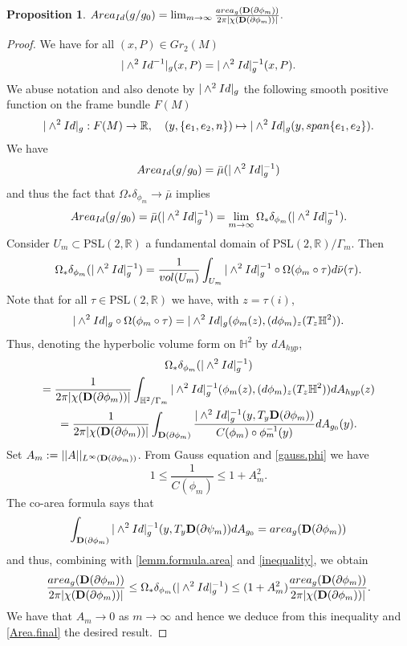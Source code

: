 \documentclass[11pt]{amsart}
\def\R{\mathbb R}
\def\H{\mathbb H}
\newtheorem{prop}[thm]{Proposition}
\theoremstyle{remark}
\theoremstyle{definition}
\begin{document}
{{	
	\begin{prop}\label{compute}   
		$ {\rm Area}_{\rm Id}(g/g_0)=\lim_{m\to\infty}\frac{{\rm area}_g({\bf D}(\partial\phi_m))}{2\pi|\chi({\bf D}(\partial\phi_m))|}.$
	\end{prop}
	\begin{proof}
		We have for all $(x,P)\in Gr_2(M)$
		$$|\wedge^2{\rm Id}^{-1}|_g(x,P)=|\wedge^2{\rm Id}|^{-1}_g(x,P).$$
		We abuse notation and also denote by $|\wedge^2{\rm Id}|_g$ the following smooth positive function on the frame bundle $F(M)$ 
		$$|\wedge^2{\rm Id}|_g: F(M)\rightarrow \R, \quad (y,\{e_1,e_2,n\})\mapsto|\wedge^2{\rm Id}|_g(y,{\rm span}\{e_1,e_2\}).$$
		We have
		$${\rm Area}_{\rm Id}(g/g_0) ={\bar\mu}(|\wedge^2{\rm Id}|^{-1}_g)$$
		and thus the fact that $\Omega_*\delta_{\phi_m}\to {\bar\mu}$ implies
		\begin{equation}\label{Area.final}
			{\rm Area}_{\rm Id}(g/g_0) ={\bar\mu}(|\wedge^2{\rm Id}|^{-1}_g)=\lim_{m\to\infty}\Omega_*\delta_{\phi_m}(|\wedge^2{\rm Id}|^{-1}_g).
		\end{equation}Consider $U_m\subset \text{PSL}(2,\R)$ a fundamental domain of $\text{PSL}(2,\R)/ \Gamma_m$. Then
		$$\Omega_*\delta_{\phi_m}(|\wedge^2{\rm Id}|^{-1}_g)=\frac{1}{vol(U_m)}\int_{U_m} |\wedge^2{\rm Id}|^{-1}_g\circ\Omega(\phi_m\circ \tau)d\bar\nu(\tau).$$
		Note that for all  $\tau\in  \text{PSL}(2,\R)$  we have, with $z=\tau(i)$,
		$$|\wedge^2{\rm Id}|_g\circ\Omega(\phi_m\circ \tau)=|\wedge^2{\rm Id}|_g(\phi_m(z),(d\phi_m)_{z}(T_z\H^2)).$$
		Thus, denoting the hyperbolic volume form on $\H^2$ by $dA_{hyp}$,
		\begin{multline}\label{lemm.formula.area}
			\Omega_*\delta_{\phi_m}(|\wedge^2{\rm Id}|^{-1}_g)\\
			=\frac{1}{2\pi|\chi({\bf D}(\partial\phi_m))|}\int_{\H^2/ \Gamma_m} |\wedge^2{\rm Id}|^{-1}_g(\phi_m(z),(d\phi_m)_{z}(T_z\H^2))dA_{hyp}(z)\\
			=\frac{1}{2\pi|\chi({\bf D}(\partial\phi_m))|}\int_{{\bf D}(\partial\phi_m)}\frac{|\wedge^2{\rm Id}|^{-1}_g(y,T_y{\bf D}(\partial\phi_m))}{C(\phi_m)\circ \phi_m^{-1}(y)}dA_{g_0}(y).
		\end{multline}
		Set $A_m:=||A||_{L^\infty({\bf D}(\partial\phi_m))}$.
		From Gauss equation and \eqref{gauss.phi} we have
		\begin{equation}\label{inequality}
			1\leq \frac{1}{C(\phi_m)}\leq 1+A_m^2.
		\end{equation}
		The co-area formula says that
		$$\int_{{\bf D}(\partial\phi_m)}{|\wedge^2{\rm Id}|^{-1}_g(y,T_y{\bf D}(\partial\psi_m))}{dA_{g_0}}={\rm area}_g({\bf D}(\partial\phi_m))$$
		and thus, combining  with \eqref{lemm.formula.area} and \eqref{inequality}, we obtain
		$$\frac{{\rm area}_g({\bf D}(\partial\phi_m))}{2\pi|\chi({\bf D}(\partial\phi_m))|}\leq \Omega_*\delta_{\phi_m}(|\wedge^2{\rm Id}|^{-1}_g)\leq (1+A_m^2)\frac{{\rm area}_g({\bf D}(\partial\phi_m))}{2\pi|\chi({\bf D}(\partial\phi_m))|}.$$
		We have that $A_m\to 0$ as $m\to\infty$ and hence we deduce from this inequality  and \eqref{Area.final} the desired result.
	\end{proof}
	
}}
\end{document}
